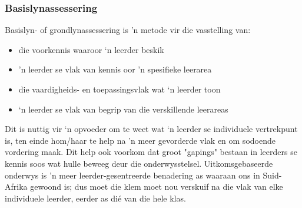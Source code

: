 \subsubsection{Basislynassessering}
Basislyn- of grondlynassessering is 'n metode vir die vasstelling van:

\begin{itemize}[noitemsep]
\item
  die voorkennis waaroor ‘n leerder beskik
\item
  ’n leerder se vlak van kennis oor 'n spesifieke leerarea
\item
  die vaardigheids- en toepassingsvlak wat ‘n leerder toon
\item
  ‘n leerder se vlak van begrip van die verskillende leerareas
\end{itemize}
Dit is nuttig vir ‘n opvoeder om te weet wat ‘n leerder se individuele vertrekpunt is, ten einde hom/haar te help na 'n meer gevorderde vlak en om sodoende vordering maak. Dit help ook voorkom dat groot "gapings" bestaan in leerders se kennis soos wat hulle beweeg deur die onderwysstelsel. Uitkomsgebaseerde onderwys is 'n meer leerder-gesentreerde benadering as waaraan ons in Suid-Afrika gewoond is; dus moet die klem moet nou verskuif na die vlak van elke individuele leerder, eerder as dié van die hele klas.\par
